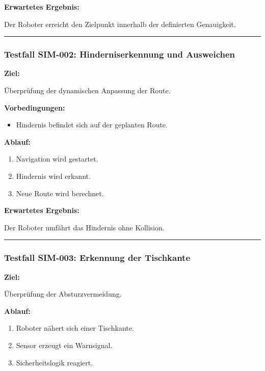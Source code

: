 \documentclass[
  a4paper,
  12pt,
  DIV=12,        %
  parskip=half,  %
  headings=small %
]{scrartcl}
\theoremstyle{definition}
\providecommand{\tightlist}{%
  \setlength{\itemsep}{0pt}\setlength{\parskip}{0pt}}
\theoremstyle{definition}
\providecommand{\tightlist}{%
  \setlength{\itemsep}{0pt}\setlength{\parskip}{0pt}}
\begin{document}
\textbf{Erwartetes Ergebnis:}

Der Roboter erreicht den Zielpunkt innerhalb der definierten
Genauigkeit.

\begin{center}\rule{0.5\linewidth}{0.5pt}\end{center}

\subsubsection{Testfall SIM-002: Hinderniserkennung und
Ausweichen}\label{testfall-sim-002-hinderniserkennung-und-ausweichen}

\textbf{Ziel:}

Überprüfung der dynamischen Anpassung der Route.

\textbf{Vorbedingungen:}

\begin{itemize}
\tightlist
\item
  Hindernis befindet sich auf der geplanten Route.
\end{itemize}

\textbf{Ablauf:}

\begin{enumerate}
\def\labelenumi{\arabic{enumi}.}
\tightlist
\item
  Navigation wird gestartet.
\item
  Hindernis wird erkannt.
\item
  Neue Route wird berechnet.
\end{enumerate}

\textbf{Erwartetes Ergebnis:}

Der Roboter umfährt das Hindernis ohne Kollision.

\begin{center}\rule{0.5\linewidth}{0.5pt}\end{center}

\subsubsection{Testfall SIM-003: Erkennung der
Tischkante}\label{testfall-sim-003-erkennung-der-tischkante}

\textbf{Ziel:}

Überprüfung der Absturzvermeidung.

\textbf{Ablauf:}

\begin{enumerate}
\def\labelenumi{\arabic{enumi}.}
\tightlist
\item
  Roboter nähert sich einer Tischkante.
\item
  Sensor erzeugt ein Warnsignal.
\item
  Sicherheitslogik reagiert.
\end{enumerate}
\end{document}
